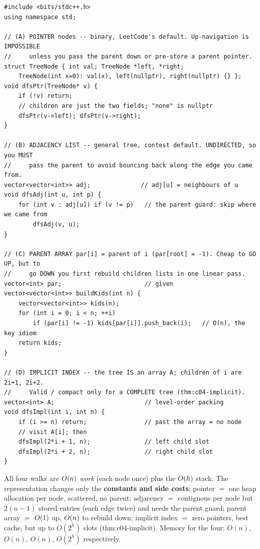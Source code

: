 \begin{lstlisting}[caption={The same ``visit all children'' loop, four storages}, label={lst:c04-reps}]
#include <bits/stdc++.h>
using namespace std;

// (A) POINTER nodes -- binary, LeetCode's default. Up-navigation is IMPOSSIBLE
//     unless you pass the parent down or pre-store a parent pointer.
struct TreeNode { int val; TreeNode *left, *right;
    TreeNode(int x=0): val(x), left(nullptr), right(nullptr) {} };
void dfsPtr(TreeNode* v) {
    if (!v) return;
    // children are just the two fields; "none" is nullptr
    dfsPtr(v->left); dfsPtr(v->right);
}

// (B) ADJACENCY LIST -- general tree, contest default. UNDIRECTED, so you MUST
//     pass the parent to avoid bouncing back along the edge you came from.
vector<vector<int>> adj;              // adj[u] = neighbours of u
void dfsAdj(int u, int p) {
    for (int v : adj[u]) if (v != p)   // the parent guard: skip where we came from
        dfsAdj(v, u);
}

// (C) PARENT ARRAY par[i] = parent of i (par[root] = -1). Cheap to GO UP, but to
//     go DOWN you first rebuild children lists in one linear pass.
vector<int> par;                       // given
vector<vector<int>> buildKids(int n) {
    vector<vector<int>> kids(n);
    for (int i = 0; i < n; ++i)
        if (par[i] != -1) kids[par[i]].push_back(i);   // O(n), the key idiom
    return kids;
}

// (D) IMPLICIT INDEX -- the tree IS an array A; children of i are 2i+1, 2i+2.
//     Valid / compact only for a COMPLETE tree (thm:c04-implicit).
vector<int> A;                         // level-order packing
void dfsImpl(int i, int n) {
    if (i >= n) return;                // past the array = no node
    // visit A[i]; then
    dfsImpl(2*i + 1, n);               // left child slot
    dfsImpl(2*i + 2, n);               // right child slot
}
\end{lstlisting}
\begin{complexitybox}
All four walks are $O(n)$ \emph{work} (each node once) plus the $O(h)$ stack.
The representation changes only the \textbf{constants and side costs}: pointer $=$ one
heap allocation per node, scattered, no parent; adjacency $=$ contiguous per node but
$2(n{-}1)$ stored entries (each edge twice) and needs the parent guard; parent array $=$
$O(1)$ up, $O(n)$ to rebuild down; implicit index $=$ zero pointers, best cache,
but up to $O(2^{h})$ slots (thm:c04-implicit). Memory for the four: $O(n)$, $O(n)$,
$O(n)$, $O(2^{h})$ respectively.
\end{complexitybox}

